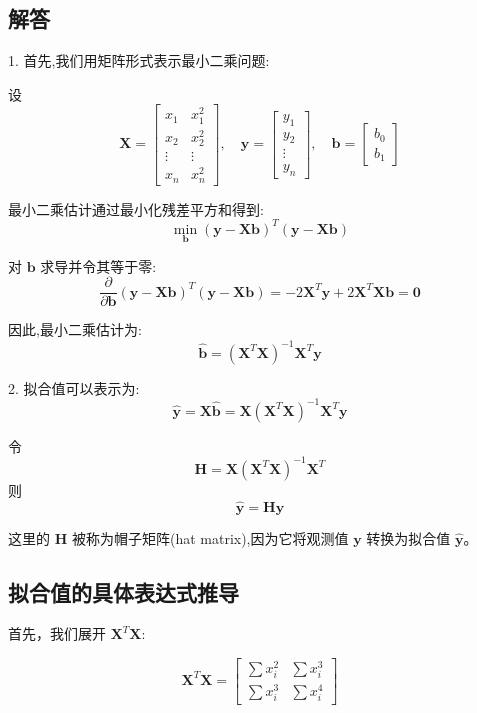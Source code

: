 \documentclass[UTF8]{report}
\theoremstyle{MyLineTheoremStyle} %
\theoremstyle{MyBlockTheoremStyle} %
\theoremstyle{MySubsubsectionStyle} %
\begin{document}
\subsection*{解答}

1. 首先,我们用矩阵形式表示最小二乘问题:

设 $$\mathbf{X} = \begin{bmatrix} 
x_1 & x_1^2 \\
x_2 & x_2^2 \\
\vdots & \vdots \\
x_n & x_n^2
\end{bmatrix}, \quad 
\mathbf{y} = \begin{bmatrix}
y_1 \\
y_2 \\
\vdots \\
y_n
\end{bmatrix}, \quad
\mathbf{b} = \begin{bmatrix}
b_0 \\
b_1
\end{bmatrix}$$

最小二乘估计通过最小化残差平方和得到:
$$\min_{\mathbf{b}} (\mathbf{y} - \mathbf{X}\mathbf{b})^T(\mathbf{y} - \mathbf{X}\mathbf{b})$$

对 $\mathbf{b}$ 求导并令其等于零:
$$\frac{\partial}{\partial \mathbf{b}}(\mathbf{y} - \mathbf{X}\mathbf{b})^T(\mathbf{y} - \mathbf{X}\mathbf{b}) = -2\mathbf{X}^T\mathbf{y} + 2\mathbf{X}^T\mathbf{X}\mathbf{b} = \mathbf{0}$$

因此,最小二乘估计为:
$$\hat{\mathbf{b}} = (\mathbf{X}^T\mathbf{X})^{-1}\mathbf{X}^T\mathbf{y}$$

2. 拟合值可以表示为:
$$\hat{\mathbf{y}} = \mathbf{X}\hat{\mathbf{b}} = \mathbf{X}(\mathbf{X}^T\mathbf{X})^{-1}\mathbf{X}^T\mathbf{y}$$

令 $$\mathbf{H} = \mathbf{X}(\mathbf{X}^T\mathbf{X})^{-1}\mathbf{X}^T$$
则 $$\hat{\mathbf{y}} = \mathbf{H}\mathbf{y}$$

这里的 $\mathbf{H}$ 被称为帽子矩阵(hat matrix),因为它将观测值 $\mathbf{y}$ 转换为拟合值 $\hat{\mathbf{y}}$。



\subsection*{拟合值的具体表达式推导}

首先，我们展开 $\mathbf{X}^T\mathbf{X}$:

$$\mathbf{X}^T\mathbf{X} = \begin{bmatrix}
\sum x_i^2 & \sum x_i^3 \\
\sum x_i^3 & \sum x_i^4
\end{bmatrix}$$
\end{document}
